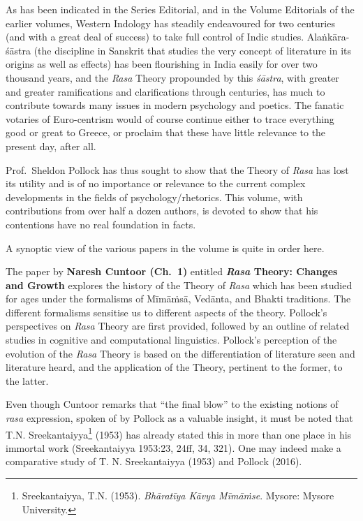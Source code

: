 \medskip

As has been indicated in the Series Editorial, and in the Volume Editorials of the earlier volumes, Western Indology has steadily endeavoured for two centuries (and with a great deal of success) to take full control of Indic studies. Alaṅkāra-śāstra (the discipline in Sanskrit that studies the very concept of literature in its origins as well as effects) has been flourishing in India easily for over two thousand years, and the \textsl{Rasa} Theory propounded by this \textsl{śāstra}, with greater and greater ramifications and clarifications through centuries, has much to contribute towards many issues in modern psychology and poetics. The fanatic votaries of Euro-centrism would of course continue either to trace everything good or great to Greece, or proclaim that these have little relevance to the present day, after all.

Prof.\ Sheldon Pollock has thus sought to show that the Theory of \textsl{Rasa} has lost its utility and is of no importance or relevance to the current complex developments in the fields of psychology/rhetorics. This volume, with contributions from over half a dozen authors, is devoted to show that his contentions have no real foundation in facts.

A synoptic view of the various papers in the volume is quite in order here.

The paper by {\bf Naresh Cuntoor (Ch.~1)} entitled {\bf\textsl{Rasa} Theory: Changes and Growth} explores the history of the Theory of \textsl{Rasa} which has been studied for ages under the formalisms of Mīmāṁsā, Vedānta, and Bhakti traditions. The different formalisms sensitise us to different aspects of the theory. Pollock’s perspectives on \textsl{Rasa} Theory are first provided, followed by an outline of related studies in cognitive and computational linguistics. Pollock’s perception of the evolution of the \textsl{Rasa} Theory is based on the differentiation of literature seen and literature heard, and the application of the Theory, pertinent to the former, to the latter.

Even though Cuntoor remarks that “the final blow” to the existing notions of \textsl{rasa} expression, spoken of by Pollock as a valuable insight, it must be noted that T.N. Sreekantaiyya\footnote[1]{Sreekantaiyya, T.N. (1953). \textsl{Bhāratīya Kāvya Mīmāṁse}. Mysore: Mysore University.} (1953) has already stated this in more than one place in his immortal work (Sreekantaiyya 1953:23, 24ff, 34, 321). One may indeed make a comparative study of T. N. Sreekantaiyya (1953) and Pollock (2016).

